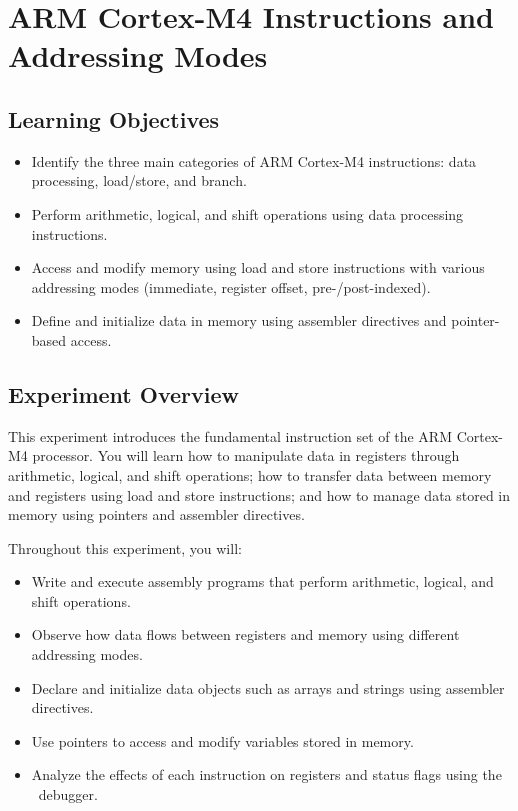 \chapter{ARM Cortex-M4 Instructions and Addressing Modes}
\section*{Learning Objectives}
\begin{itemize}[nosep]
  \item Identify the three main categories of ARM Cortex-M4 instructions: data processing, load/store, and branch.  
  \item Perform arithmetic, logical, and shift operations using data processing instructions.  
  \item Access and modify memory using load and store instructions with various addressing modes (immediate, register offset, pre-/post-indexed).  
  \item Define and initialize data in memory using assembler directives and pointer-based access.  
\end{itemize}

\section*{Experiment Overview}
This experiment introduces the fundamental instruction set of the ARM Cortex-M4 processor.  
You will learn how to manipulate data in registers through arithmetic, logical, and shift operations; how to transfer data between memory and registers using load and store instructions; and how to manage data stored in memory using pointers and assembler directives.  

Throughout this experiment, you will:
\begin{itemize}[nosep]
  \item Write and execute assembly programs that perform arithmetic, logical, and shift operations.  
  \item Observe how data flows between registers and memory using different addressing modes.  
  \item Declare and initialize data objects such as arrays and strings using assembler directives.  
  \item Use pointers to access and modify variables stored in memory.  
  \item Analyze the effects of each instruction on registers and status flags using the \keil\ debugger.  
\end{itemize}

